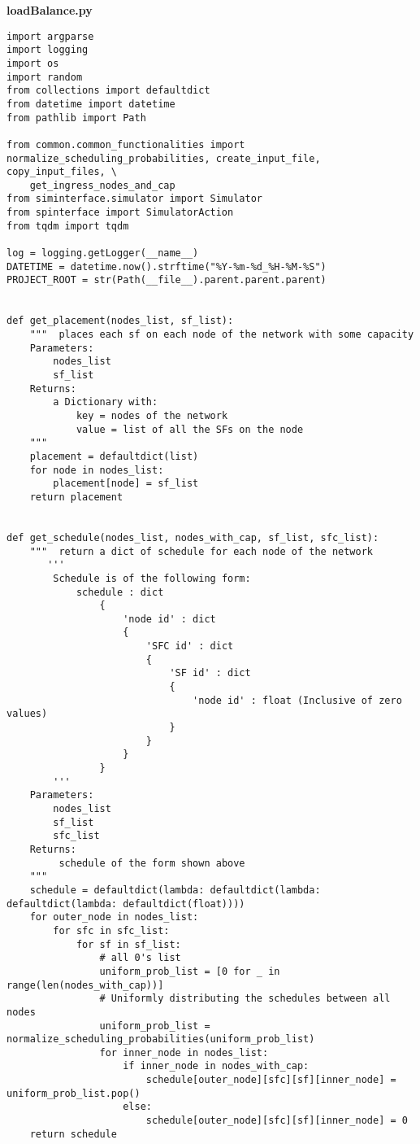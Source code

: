 \textbf{loadBalance.py}

\begin{lstlisting}
import argparse
import logging
import os
import random
from collections import defaultdict
from datetime import datetime
from pathlib import Path

from common.common_functionalities import normalize_scheduling_probabilities, create_input_file, copy_input_files, \
    get_ingress_nodes_and_cap
from siminterface.simulator import Simulator
from spinterface import SimulatorAction
from tqdm import tqdm

log = logging.getLogger(__name__)
DATETIME = datetime.now().strftime("%Y-%m-%d_%H-%M-%S")
PROJECT_ROOT = str(Path(__file__).parent.parent.parent)


def get_placement(nodes_list, sf_list):
    """  places each sf on each node of the network with some capacity
    Parameters:
        nodes_list
        sf_list
    Returns:
        a Dictionary with:
            key = nodes of the network
            value = list of all the SFs on the node
    """
    placement = defaultdict(list)
    for node in nodes_list:
        placement[node] = sf_list
    return placement


def get_schedule(nodes_list, nodes_with_cap, sf_list, sfc_list):
    """  return a dict of schedule for each node of the network
       '''
        Schedule is of the following form:
            schedule : dict
                {
                    'node id' : dict
                    {
                        'SFC id' : dict
                        {
                            'SF id' : dict
                            {
                                'node id' : float (Inclusive of zero values)
                            }
                        }
                    }
                }
        '''
    Parameters:
        nodes_list
        sf_list
        sfc_list
    Returns:
         schedule of the form shown above
    """
    schedule = defaultdict(lambda: defaultdict(lambda: defaultdict(lambda: defaultdict(float))))
    for outer_node in nodes_list:
        for sfc in sfc_list:
            for sf in sf_list:
                # all 0's list
                uniform_prob_list = [0 for _ in range(len(nodes_with_cap))]
                # Uniformly distributing the schedules between all nodes
                uniform_prob_list = normalize_scheduling_probabilities(uniform_prob_list)
                for inner_node in nodes_list:
                    if inner_node in nodes_with_cap:
                        schedule[outer_node][sfc][sf][inner_node] = uniform_prob_list.pop()
                    else:
                        schedule[outer_node][sfc][sf][inner_node] = 0
    return schedule



\end{lstlisting}
